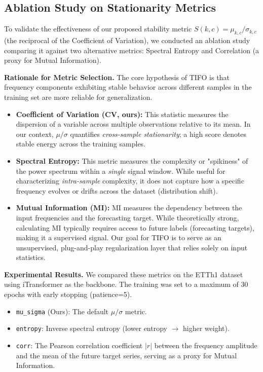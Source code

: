 \documentclass[sigconf,anonymous,review]{acmart}
\newcommand{\methodn}{\textsc{TIFO}}
\newcommand{\method}{\textsc{\methodn}\xspace}
\begin{document}
\subsection{Ablation Study on Stationarity Metrics}
\label{app:metric_ablation}

To validate the effectiveness of our proposed stability metric $S(k,c) = \mu_{k,c}/\sigma_{k,c}$ (the reciprocal of the Coefficient of Variation), we conducted an ablation study comparing it against two alternative metrics: Spectral Entropy and Correlation (a proxy for Mutual Information).

\textbf{Rationale for Metric Selection.}
The core hypothesis of \method is that frequency components exhibiting stable behavior across different samples in the training set are more reliable for generalization.
\begin{itemize}
    \item \textbf{Coefficient of Variation (CV, ours):} This statistic measures the dispersion of a variable across multiple observations relative to its mean. In our context, $\mu/\sigma$ quantifies \textit{cross-sample stationarity}; a high score denotes stable energy across the training samples.
    \item \textbf{Spectral Entropy:} This metric measures the complexity or "spikiness" of the power spectrum within a \textit{single} signal window. While useful for characterizing \textit{intra-sample} complexity, it does not capture how a specific frequency evolves or drifts across the dataset (distribution shift).
    \item \textbf{Mutual Information (MI):} MI measures the dependency between the input frequencies and the forecasting target. While theoretically strong, calculating MI typically requires access to future labels (forecasting targets), making it a supervised signal. Our goal for \method is to serve as an unsupervised, plug-and-play regularization layer that relies solely on input statistics.
\end{itemize}

\textbf{Experimental Results.}
We compared these metrics on the ETTh1 dataset using iTransformer as the backbone. The training was set to a maximum of 30 epochs with early stopping (patience=5).
\begin{itemize}
    \item \texttt{mu\_sigma} (Ours): The default $\mu/\sigma$ metric.
    \item \texttt{entropy}: Inverse spectral entropy (lower entropy $\rightarrow$ higher weight).
    \item \texttt{corr}: The Pearson correlation coefficient $|r|$ between the frequency amplitude and the mean of the future target series, serving as a proxy for Mutual Information.
\end{itemize}
\end{document}

